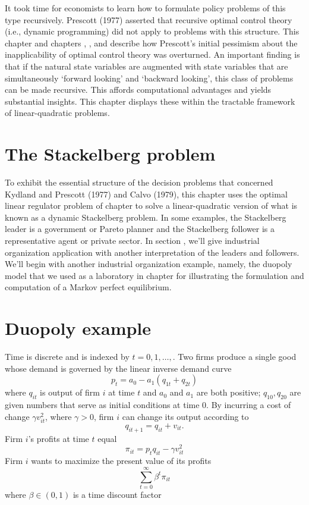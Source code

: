 It took  time for economists to learn how to formulate policy problems of this type
recursively.
Prescott  (1977) asserted that
 recursive optimal control theory (i.e., dynamic programming) did not apply
to problems with this structure.  This chapter and chapters ,
, and  describe
how Prescott's initial pessimism about the inapplicability
of optimal control theory was overturned.
An important finding is that if the natural state variables
are augmented with state variables that are simultaneously  `forward looking' and `backward looking', this class of problems
can be made recursive. This affords
computational advantages and yields substantial insights.
  This chapter displays these
within the tractable framework of linear-quadratic problems.

\section{The Stackelberg problem}

To exhibit the essential structure of
the decision problems that concerned Kydland and Prescott (1977) and Calvo (1979),
this chapter uses the optimal linear regulator problem of chapter 
to solve a linear-quadratic version of
what is known as a dynamic Stackelberg problem.
In some examples, the  Stackelberg leader is  a government or Pareto planner and
the Stackelberg follower is a representative agent or
private sector.  In section ,   we'll give industrial organization
 application with another  interpretation of the leaders and followers.
 We'll begin with another industrial organization example, namely,
 the duopoly model that we used as a laboratory  in chapter  for illustrating
 the formulation and computation of a Markov perfect equilibrium.



\section{Duopoly example}\label{sec:duopoly}%
Time is discrete and is indexed by $t = 0, 1, \ldots, $.
Two firms produce a single good whose demand is governed by the linear inverse demand curve
$$ p_t = a_0 - a_1 (q_{1t}+ q_{2t} ) $$
where $q_{it}$ is output of firm $i$ at time $t$ and $a_0$ and $a_1$ are both positive;
$q_{10}, q_{20}$ are given numbers that serve as  initial conditions at time $0$.
By incurring a cost of change $ \gamma v_{it}^2  $,
where $\gamma > 0$,  firm $i$ can change its output according to
$$ q_{it+1} = q_{it} + v_{it} . $$
Firm $i$'s profits at time $t$ equal
$$ \pi_{it} = p_t q_{it} - \gamma v_{it}^2 $$
Firm $i$ wants to maximize the present value of its profits
$$ \sum_{t=0}^\infty \beta^t \pi_{it}  $$
where  $\beta \in (0,1)$ is a time discount factor

